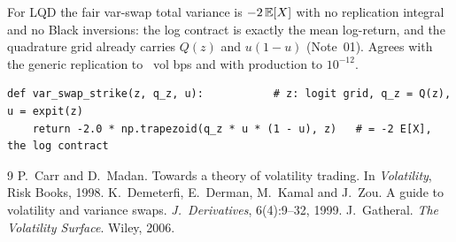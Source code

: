 \documentclass[11pt]{article}
\begin{document}
For LQD the fair var-swap total variance is $-2\,\mathbb{E}[X]$ with no replication integral
and no Black inversions: the log contract is exactly the mean log-return, and the
quadrature grid already carries $Q(z)$ and $u(1-u)$ (Note~01). Agrees with the
generic replication to \vsagreebp\ vol bps and with production to $10^{-12}$.

\begin{lstlisting}[caption={The LQD closed-form var-swap strike, the mean
log-return (distilled from \texttt{models/lqd/quadrature.py}).}]
def var_swap_strike(z, q_z, u):           # z: logit grid, q_z = Q(z), u = expit(z)
    return -2.0 * np.trapezoid(q_z * u * (1 - u), z)   # = -2 E[X], the log contract
\end{lstlisting}

\begin{thebibliography}{9}
 P.~Carr and D.~Madan. Towards a theory of volatility
trading. In \emph{Volatility}, Risk Books, 1998.
 K.~Demeterfi, E.~Derman, M.~Kamal and J.~Zou.
A guide to volatility and variance swaps. \emph{J.\ Derivatives}, 6(4):9--32, 1999.
 J.~Gatheral. \emph{The Volatility Surface}. Wiley, 2006.
\end{thebibliography}
\end{document}
